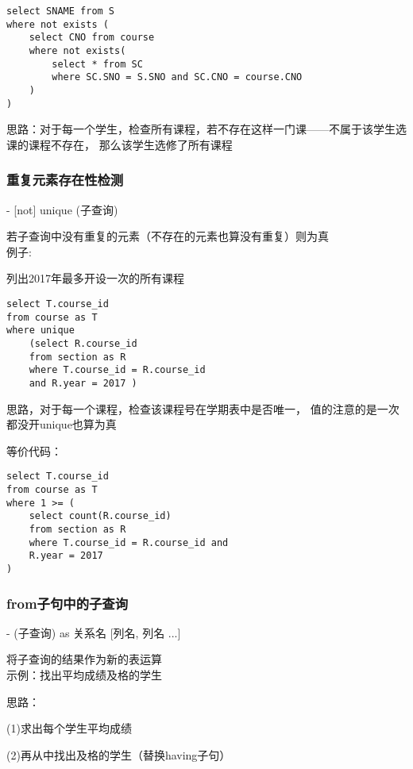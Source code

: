 \documentclass{article}        %
\begin{document}
\begin{verbatim}  
select SNAME from S 
where not exists ( 
    select CNO from course 
    where not exists( 
        select * from SC 
        where SC.SNO = S.SNO and SC.CNO = course.CNO
    )
)
\end{verbatim}

思路：对于每一个学生，检查所有课程，若不存在这样一门课——不属于该学生选课的课程不存在，
那么该学生选修了所有课程




\subsubsection{重复元素存在性检测}

- [not] unique (子查询) 

若子查询中没有重复的元素（不存在的元素也算没有重复）则为真 \\

例子:

列出2017年最多开设一次的所有课程

\begin{verbatim} 
select T.course_id 
from course as T 
where unique 
    (select R.course_id 
    from section as R 
    where T.course_id = R.course_id 
    and R.year = 2017 )
\end{verbatim}

思路，对于每一个课程，检查该课程号在学期表中是否唯一，
值的注意的是一次都没开unique也算为真

等价代码：

\begin{verbatim} 
select T.course_id  
from course as T 
where 1 >= (
    select count(R.course_id) 
    from section as R 
    where T.course_id = R.course_id and 
    R.year = 2017
)
\end{verbatim}

\subsubsection{from子句中的子查询}

- (子查询) as 关系名 [列名, 列名 ...] 

将子查询的结果作为新的表运算\\ 

示例：找出平均成绩及格的学生

思路： 

(1)求出每个学生平均成绩 

(2)再从中找出及格的学生（替换having子句）
\end{document}
